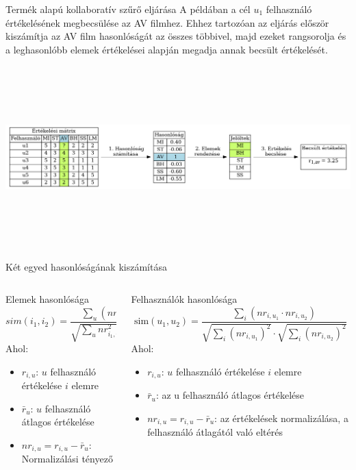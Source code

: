 \documentclass[english, aspectratio=169]{beamer}
\begin{document}
\begin{frame}{Termék alapú kollaboratív szűrő eljárása}
A példában a cél $u_1$ felhasználó értékelésének megbecsülése az AV filmhez. Ehhez tartozóan  az eljárás először kiszámítja az AV film hasonlóságát az összes többivel, majd ezeket rangsorolja és a leghasonlóbb elemek értékelései alapján megadja annak becsült értékelését.\par\medskip
\begin{center}
\includegraphics[width=14cm, height=7cm, keepaspectratio]{graphs/recommender_5.png}
\end{center}
\end{frame}

\begin{frame}{Két egyed hasonlóságának kiszámítása}
\begin{columns}
\begin{column}{.5\textwidth}
\begin{block}{Elemek hasonlósága}
\[
sim\left( i_1,i_2 \right) = \frac{\sum_u\left( nr_{i_1,u} \cdot nr_{i_2,u} \right)}{\sqrt{\sum_u nr^2_{i_1,u}} \cdot \sqrt{\sum_u nr^2_{i_1,u}}}
\]
Ahol:
\begin{itemize}
	\item $r_{i,u}$: $u$ felhasználó értékelése $i$ elemre
	\item $\bar{r}_u$: $u$ felhasználó átlagos értékelése
	\item $nr_{i,u}=r_{i,u} - \bar{r}_u$: Normalizálási tényező
\end{itemize}
\end{block}
\end{column}
\begin{column}{.5\textwidth}
\begin{block}{Felhasználók hasonlósága}
\[
\text{sim}(u_1, u_2) = \frac{\sum_{i} (nr_{i,u_1} \cdot nr_{i,u_2})}
{\sqrt{\sum_{i} (nr_{i,u_1})^2} \cdot \sqrt{\sum_{i} (nr_{i,u_2})^2}}
\]
Ahol:
\begin{itemize}
    \item \( r_{i,u} \): $u$ felhasználó értékelése $i$ elemre
    \item \( \bar{r}_u \): az u felhasználó átlagos értékelése
    \item \( nr_{i,u} = r_{i,u} - \bar{r}_u \): az értékelések normalizálása, a felhasználó átlagától való eltérés
\end{itemize}
\end{block}
\end{column}
\end{columns}
\end{frame}
\end{document}
